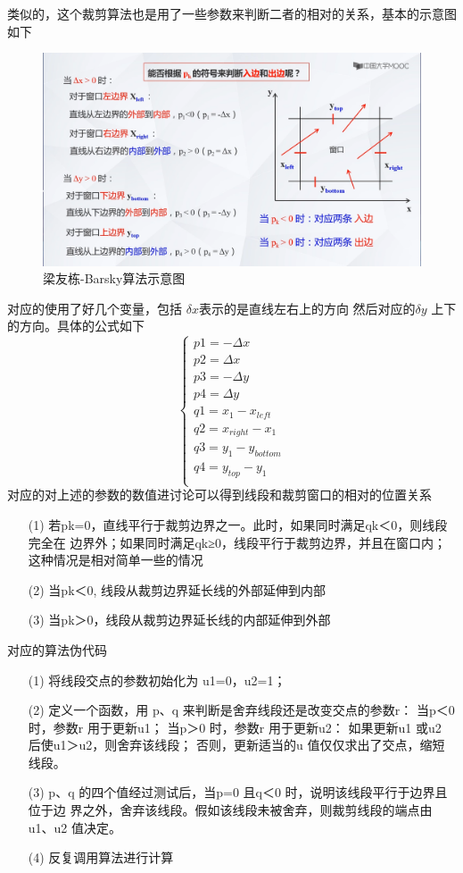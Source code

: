 \documentclass[a4paper,UTF8]{article}
\theoremstyle{definition}
\begin{document}
类似的，这个裁剪算法也是用了一些参数来判断二者的相对的关系，基本的示意图如下
\begin{figure}[h]
	\centering
	\includegraphics[scale=0.2]{figure/example.png}
	\caption{梁友栋-Barsky算法示意图}
	\label{fig:Barsky}
\end{figure}
对应的使用了好几个变量，包括 $\delta x$表示的是直线左右上的方向
然后对应的$\delta y$ 上下的方向。具体的公式如下\\
$$
\begin{cases}
    p1 = - \Delta x \\
    p2 = \Delta x\\
    p3 = - \Delta y \\
    p4 = \Delta y\\
    q1 = x_{1} - x_{left} \\
    q2 = x_{right} - x_{1}\\
    q3 = y_{1} -y_{bottom} \\
    q4 = y_{top} - y_{1}\\
\end{cases}
$$
对应的对上述的参数的数值进讨论可以得到线段和裁剪窗口的相对的位置关系

\begin{itemize}
    \item [(1)] 
    若pk=0，直线平行于裁剪边界之一。此时，如果同时满足qk＜0，则线段完全在
    边界外；如果同时满足qk≥0，线段平行于裁剪边界，并且在窗口内；这种情况是相对简单一些的情况
    \item [(2)]
    当pk＜0, 线段从裁剪边界延长线的外部延伸到内部
    \item [(3)]
    当pk＞0，线段从裁剪边界延长线的内部延伸到外部
  \end{itemize}

对应的算法伪代码
\begin{itemize}
    \item [(1)] 
    将线段交点的参数初始化为 u1=0，u2=1；
    \item [(2)]
    定义一个函数，用 p、q 来判断是舍弃线段还是改变交点的参数r：
    当p＜0 时，参数r 用于更新u1；
    当p＞0 时，参数r 用于更新u2：
    如果更新u1 或u2 后使u1＞u2，则舍弃该线段；
    否则，更新适当的u 值仅仅求出了交点，缩短线段。
    \item [(3)]
    p、q 的四个值经过测试后，当p=0 且q＜0 时，说明该线段平行于边界且位于边
    界之外，舍弃该线段。假如该线段未被舍弃，则裁剪线段的端点由u1、u2 值决定。
    \item [(4)]
    反复调用算法进行计算
  \end{itemize}
\end{document}
